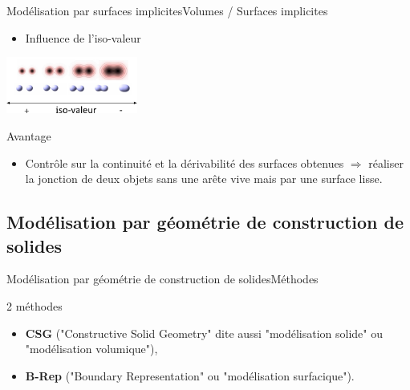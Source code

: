 \documentclass{beamer}
\begin{document}
\begin{frame}[c]{Modélisation par surfaces implicites}{Volumes / Surfaces implicites}
    \begin{itemize}
        \item Influence de l'iso-valeur
    \end{itemize}
\begin{center}
    \includegraphics[width=4.3cm]{surfaceImplicite/influence.png}
\end{center}

    \begin{block}{Avantage}
        \begin{itemize}
            \item Contrôle sur la continuité et la dérivabilité des surfaces obtenues
\newline $\Rightarrow$ réaliser la jonction de deux objets sans une arête vive mais par une surface lisse.
        \end{itemize}

    \end{block}
\end{frame}

\subsection{Modélisation par géométrie de construction de solides}
\begin{frame}[c]{Modélisation par géométrie de construction de solides}{Méthodes}

\begin{block}{2 méthodes}


\begin{itemize}
\item \textbf{CSG} ("Constructive Solid Geometry" dite aussi "modélisation solide" ou "modélisation volumique"),
\item \textbf{B-Rep} ("Boundary Representation" ou "modélisation surfacique").
\end{itemize}

\end{block}
\end{frame}
\end{document}
